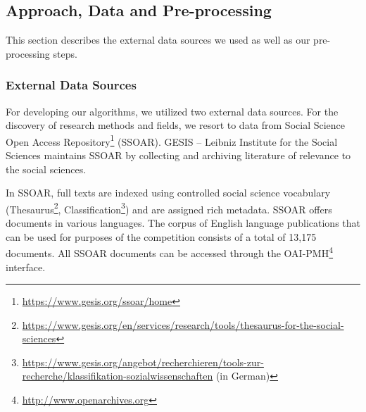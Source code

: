 \subsection{Approach, Data and Pre-processing}
\label{subsec:overview}
This section describes the external data sources we used as well as our pre-processing steps.



\subsubsection{External Data Sources}
\label{section:external_data_sources}
For developing our algorithms, we utilized two external data sources. For the discovery of research methods and fields, we resort to data from Social Science Open Access Repository\footnote{\url{https://www.gesis.org/ssoar/home}} (SSOAR). 
GESIS – Leibniz Institute for the Social Sciences maintains  SSOAR by collecting and archiving literature of relevance to the social sciences. 

In SSOAR, full texts are indexed using controlled social science vocabulary (Thesaurus\footnote{\url{https://www.gesis.org/en/services/research/tools/thesaurus-for-the-social-sciences}}, Classification\footnote{\url{https://www.gesis.org/angebot/recherchieren/tools-zur-recherche/klassifikation-sozialwissenschaften} (in German)}) and are assigned rich metadata. SSOAR offers documents in various languages. The corpus of English language publications that can be used for purposes of the competition consists of a total of 13,175 documents. All SSOAR documents can be accessed through the OAI-PMH\footnote{{\url{http://www.openarchives.org}}} interface. 

